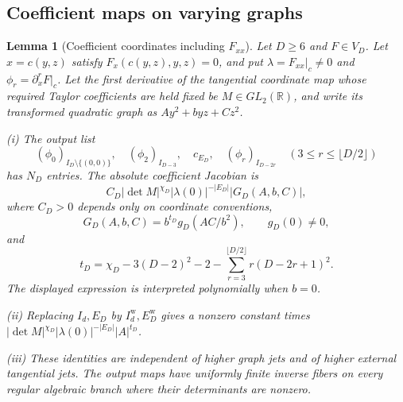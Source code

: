 \documentclass[11pt]{amsart}
\makeatletter
\newtheorem{lemma}[theorem]{Lemma}
\theoremstyle{definition}
\theoremstyle{remark}
\numberwithin{equation}{section}
\newcommand{\equationalias}[1]{\begingroup\protected@edef\@currentlabel{\p@equation\theequation}\protected@edef\@currentHref{equation.\theHequation}\label{#1}\endgroup}
\makeatother
\begin{document}
\subsection{Coefficient maps on varying graphs}\label{atlas:moving}\label{low:78:h3n:section}
\begin{lemma}[Coefficient coordinates including \texorpdfstring{$F_{xx}$}{Fxx}]\label{surf:strong-atlas}
Let $D\ge6$ and $F\in V_D$. Let $x=c(y,z)$ satisfy $F_x(c(y,z),y,z)=0$, and put $\lambda=F_{xx}|_c\ne0$ and $\phi_r=\partial_x^rF|_c$. Let the first derivative of the tangential coordinate map whose required Taylor coefficients are held fixed be $M\in GL_2(\mathbb R)$, and write its transformed quadratic graph as $Ay^2+byz+Cz^2$.

\noindent\textup{(i)} The output list
\begin{equation}\label{surf:ordinary-list}
 (\phi_0)_{I_D\setminus\{(0,0)\}},\quad (\phi_2)_{I_{D-3}},\quad c_{E_D},\quad (\phi_r)_{I_{D-2r}}\quad(3\le r\le\lfloor D/2\rfloor)
\end{equation}
has $N_D$ entries. The absolute coefficient Jacobian is
\begin{equation}\label{surf:strong-jacobian}
C_D|\det M|^{\chi_D}|\lambda(0)|^{-|E_D|}|G_D(A,b,C)|,
\end{equation}
where $C_D>0$ depends only on coordinate conventions,
\begin{equation}\label{surf:quadratic-factor}
G_D(A,b,C)=b^{t_D}g_D(AC/b^2),\qquad g_D(0)\ne0,
\end{equation}
\equationalias{low:78:h3n:det-character}
and
\begin{equation}\label{surf:tD}
t_D=\chi_D-3(D-2)^2-2-\sum_{r=3}^{\lfloor D/2\rfloor}r(D-2r+1)^2.
\end{equation}
The displayed expression is interpreted polynomially when $b=0$.

\noindent\textup{(ii)} Replacing $I_d,E_D$ by $I_d^{\mathrm w},E_D^{\mathrm w}$ gives a nonzero constant times $|\det M|^{\chi_D}|\lambda(0)|^{-|E_D|}|A|^{t_D}$.

\noindent\textup{(iii)} These identities are independent of higher graph jets and of higher external tangential jets. The output maps have uniformly finite inverse fibers on every regular algebraic branch where their determinants are nonzero.
\end{lemma}
\end{document}

